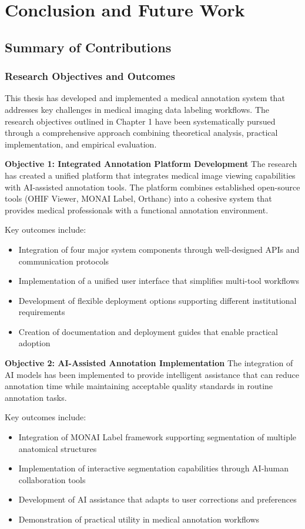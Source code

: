 \chapter{Conclusion and Future Work}

\section{Summary of Contributions}

\subsection{Research Objectives and Outcomes}

This thesis has developed and implemented a medical annotation system that addresses key challenges in medical imaging data labeling workflows. The research objectives outlined in Chapter 1 have been systematically pursued through a comprehensive approach combining theoretical analysis, practical implementation, and empirical evaluation.

\textbf{Objective 1: Integrated Annotation Platform Development}
The research has created a unified platform that integrates medical image viewing capabilities with AI-assisted annotation tools. The platform combines established open-source tools (OHIF Viewer, MONAI Label, Orthanc) into a cohesive system that provides medical professionals with a functional annotation environment.

Key outcomes include:
\begin{itemize}
    \item Integration of four major system components through well-designed APIs and communication protocols
    \item Implementation of a unified user interface that simplifies multi-tool workflows
    \item Development of flexible deployment options supporting different institutional requirements
    \item Creation of documentation and deployment guides that enable practical adoption
\end{itemize}

\textbf{Objective 2: AI-Assisted Annotation Implementation}
The integration of AI models has been implemented to provide intelligent assistance that can reduce annotation time while maintaining acceptable quality standards in routine annotation tasks.

Key outcomes include:
\begin{itemize}
    \item Integration of MONAI Label framework supporting segmentation of multiple anatomical structures
    \item Implementation of interactive segmentation capabilities through AI-human collaboration tools
    \item Development of AI assistance that adapts to user corrections and preferences
    \item Demonstration of practical utility in medical annotation workflows
\end{itemize}

